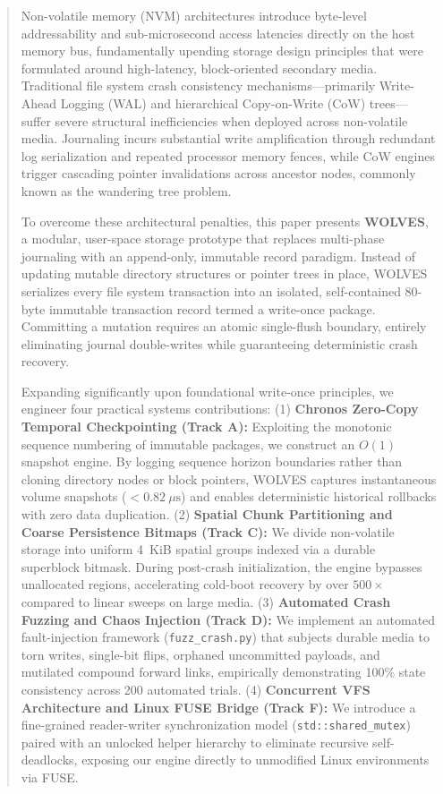 \documentclass[conference]{IEEEtran}
\begin{document}
\begin{abstract}
Non-volatile memory (NVM) architectures introduce byte-level addressability and sub-microsecond access latencies directly on the host memory bus, fundamentally upending storage design principles that were formulated around high-latency, block-oriented secondary media. Traditional file system crash consistency mechanisms---primarily Write-Ahead Logging (WAL) and hierarchical Copy-on-Write (CoW) trees---suffer severe structural inefficiencies when deployed across non-volatile media. Journaling incurs substantial write amplification through redundant log serialization and repeated processor memory fences, while CoW engines trigger cascading pointer invalidations across ancestor nodes, commonly known as the wandering tree problem.

To overcome these architectural penalties, this paper presents \textbf{WOLVES}, a modular, user-space storage prototype that replaces multi-phase journaling with an append-only, immutable record paradigm. Instead of updating mutable directory structures or pointer trees in place, WOLVES serializes every file system transaction into an isolated, self-contained 80-byte immutable transaction record termed a write-once package. Committing a mutation requires an atomic single-flush boundary, entirely eliminating journal double-writes while guaranteeing deterministic crash recovery.

Expanding significantly upon foundational write-once principles, we engineer four practical systems contributions:
(1) \textbf{Chronos Zero-Copy Temporal Checkpointing (Track A):} Exploiting the monotonic sequence numbering of immutable packages, we construct an $O(1)$ snapshot engine. By logging sequence horizon boundaries rather than cloning directory nodes or block pointers, WOLVES captures instantaneous volume snapshots ($<0.82~\mu\text{s}$) and enables deterministic historical rollbacks with zero data duplication.
(2) \textbf{Spatial Chunk Partitioning and Coarse Persistence Bitmaps (Track C):} We divide non-volatile storage into uniform 4~KiB spatial groups indexed via a durable superblock bitmask. During post-crash initialization, the engine bypasses unallocated regions, accelerating cold-boot recovery by over $500\times$ compared to linear sweeps on large media.
(3) \textbf{Automated Crash Fuzzing and Chaos Injection (Track D):} We implement an automated fault-injection framework (\texttt{fuzz\_crash.py}) that subjects durable media to torn writes, single-bit flips, orphaned uncommitted payloads, and mutilated compound forward links, empirically demonstrating 100\% state consistency across 200 automated trials.
(4) \textbf{Concurrent VFS Architecture and Linux FUSE Bridge (Track F):} We introduce a fine-grained reader-writer synchronization model (\texttt{std::shared\_mutex}) paired with an unlocked helper hierarchy to eliminate recursive self-deadlocks, exposing our engine directly to unmodified Linux environments via FUSE.


\end{abstract}
\end{document}
